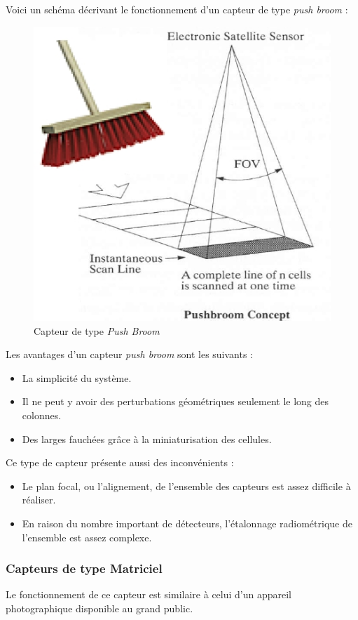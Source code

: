 \documentclass[a4paper, 11pt]{report}
\begin{document}
Voici un schéma décrivant le fonctionnement d'un capteur de type \emph{push broom} \citep{Hillen2009}:
\begin{figure}[H]
	\centering
	\includegraphics[scale=0.5]{Images/Push_Broom.jpg}
	\caption{Capteur de type \emph{Push Broom}}
\end{figure}
Les avantages d'un capteur \emph{push broom} sont les suivants :
\begin{itemize}
	\item La simplicité du système.
	\item Il ne peut y avoir des perturbations géométriques seulement le long des colonnes.
	\item Des larges fauchées grâce à la miniaturisation des cellules.
\end{itemize}
Ce type de capteur présente aussi des inconvénients :
\begin{itemize}
	\item Le plan focal, ou l'alignement, de l'ensemble des capteurs est assez difficile à réaliser.
	\item En raison du nombre important de détecteurs, l'étalonnage radiométrique de l'ensemble est assez complexe.
\end{itemize}

\subsubsection{Capteurs de type Matriciel}
Le fonctionnement de ce capteur est similaire à celui d'un appareil photographique disponible au grand public.
\end{document}
